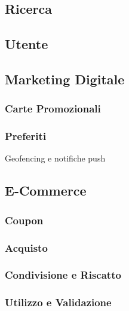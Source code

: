 \subsection{Ricerca}

\subsection{Utente}

\subsection{Marketing Digitale}

\subsubsection{Carte Promozionali}

\subsubsection{Preferiti}

Geofencing e notifiche push

\subsection{E-Commerce}

\subsubsection{Coupon}

\subsubsection{Acquisto}

\subsubsection{Condivisione e Riscatto}

\subsubsection{Utilizzo e Validazione}

\newpage